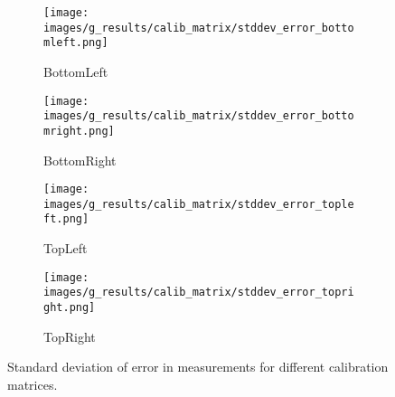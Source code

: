\begin{figure}[ht]
    \centering
    \begin{subfigure}[b]{0.46\textwidth}
        \centering
        \texttt{[image: images/g\_results/calib\_matrix/stddev\_error\_bottomleft.png]}
        \caption{\textsf{BottomLeft}}
    \end{subfigure}
    \hspace{1cm}
    \begin{subfigure}[b]{0.46\textwidth}
        \centering
        \texttt{[image: images/g\_results/calib\_matrix/stddev\_error\_bottomright.png]}
        \caption{\textsf{BottomRight}}
    \end{subfigure}

    \vspace{5mm}
    
    \begin{subfigure}[b]{0.46\textwidth}
        \centering
        \texttt{[image: images/g\_results/calib\_matrix/stddev\_error\_topleft.png]}
        \caption{\textsf{TopLeft}}
    \end{subfigure}
    \hspace{1cm}
    \begin{subfigure}[b]{0.46\textwidth}
        \centering
        \texttt{[image: images/g\_results/calib\_matrix/stddev\_error\_topright.png]}
        \caption{\textsf{TopRight}}
    \end{subfigure}

    \caption{Standard deviation of error in measurements for different calibration matrices.}
    \label{fig:stddev_error_calib_matrices}
\end{figure}


    
